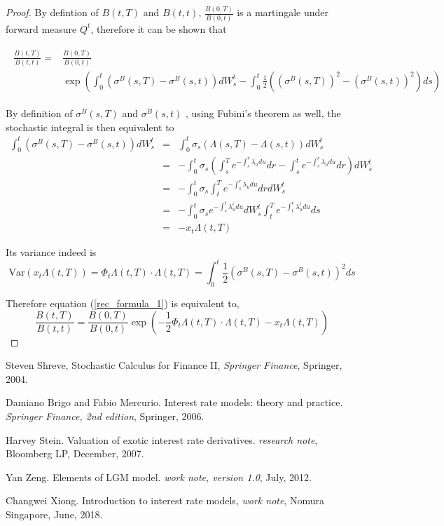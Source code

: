 \documentclass[10pt]{article}
\theoremstyle{plain}
\numberwithin{equation}{section}
\numberwithin{table}{section}
\begin{document}
\begin{proof}

By defintion of $B(t,T)$ and $B(t,t)$, $\frac{B(0,T)}{B(0,t)}$ is a
martingale under forward measure $Q^t$, therefore it can be shown
that

\begin{eqnarray}
\begin{split}
    \frac{B(t,T)}{B(t,t)}=&\frac{B(0,T)}{B(0,t)}\\
    &\exp
\left(\int_{0}^{t}(\sigma _{{}}^{B}(s,T)-\sigma
_{{}}^{B}(s,t))dW^t_{s}-\int_{0}^{t}\frac{1}{2}((\sigma
_{{}}^{B}(s,T))^{2}-(\sigma _{{}}^{B}(s,t))^{2})ds\right)
\end{split}
\label{rec_formula_1}
\end{eqnarray}
        
By definition of $\sigma _{{}}^{B}(s,T)$ and $\sigma _{{}}^{B}(s,t)$
, using Fubini's theorem as well, the stochastic integral is then
equivalent to
\begin{eqnarray*}
\int_{0}^{t}(\sigma _{{}}^{B}(s,T)-\sigma _{{}}^{B}(s,t))dW^t_{s}
&=&\int_{0}^{t}\sigma _{s}^{{}}(\Lambda (s,T)-\Lambda (s,t))dW^t_{s}\\
&=&-\int_{0}^{t}\sigma _{s}^{{}}(\int_{s}^{T}e^{-\int_{s}^{r}\lambda
_{u}du}dr-\int_{s}^{t}e^{-\int_{s}^{r}\lambda _{u}du}dr)dW^t_{s}\\
&=&-\int_{0}^{t}\sigma _{s}^{{}}\int_{t}^{T}e^{-\int_{s}^{r}\lambda
_{u}du}drdW^t_{s}\\
&=& -\int_{0}^{t}\sigma _{s}e^{-\int_{s}^{t}\lambda
_{u}^idu}dW^t_{s} \int_{t}^{T}e^{-\int_{t}^{r}\lambda
_{u}^idu}ds\\
    &=&-x_{t}\Lambda (t,T)
\end{eqnarray*}

Its variance indeed is
\[
\mathrm{Var}(x_{t}\Lambda (t,T))=\Phi _{t}\Lambda (t,T)\cdot \Lambda
(t,T)=\int_{0}^{t}\frac{1}{2}(\sigma _{{}}^{B}(s,T)-\sigma
_{{}}^{B}(s,t))^{2}ds
\]

Therefore equation (\ref{rec_formula_1}) is equivalent to,
\[
\frac{B(t,T)}{B(t,t)}=\frac{B(0,T)}{B(0,t)}\exp (-\frac{1}{2}\Phi
_{t}\Lambda (t,T)\cdot \Lambda (t,T)-x_{t}\Lambda (t,T))
\]
        
\end{proof}



\newpage

\begin{thebibliography}{99}
 Steven Shreve, Stochastic Calculus for Finance II, {\it Springer Finance},  Springer, 2004. 

 Damiano Brigo and Fabio Mercurio. Interest rate models: theory and practice. {\it Springer Finance, 2nd edition}, Springer, 2006.

 Harvey Stein. Valuation of exotic interest rate derivatives. {\it research note}, Bloomberg LP, December, 2007.

 Yan Zeng. Elements of LGM model. {\it
work note, version 1.0}, July, 2012.

 Changwei Xiong. Introduction to interest rate models, {\it work note}, Nomura Singapore, June, 2018.

\end{thebibliography}
\end{document}
